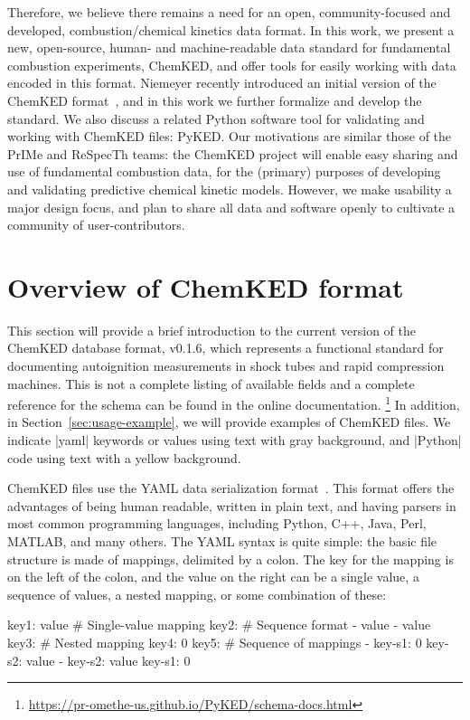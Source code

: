 \documentclass[12pt]{ijck}
\newcommand\ck{ChemKED}
\newcommand\pk{PyKED}
\begin{document}
Therefore, we believe there remains a need for an open, community-focused and
developed, combustion\slash chemical kinetics data format. In this work, we
present a new, open-source, human- and machine-readable data standard for
fundamental combustion experiments, \ck{}, and offer tools for easily working
with data encoded in this format. Niemeyer recently introduced an initial
version of the \ck{} format~\autocite{Niemeyer:2016wf}, and in this work we
further formalize and develop the standard. We also discuss a related Python
software tool for validating and working with \ck{} files: \pk{}. Our
motivations are similar those of the PrIMe and ReSpecTh teams: the \ck{} project
will enable easy sharing and use of fundamental combustion data, for the
(primary) purposes of developing and validating predictive chemical kinetic
models. However, we make usability a major design focus, and plan to share all
data and software openly to cultivate a community of user-contributors.

\section{Overview of ChemKED format}\label{sec:overview-of-format}

This section will provide a brief introduction to the current version of the
\ck{} database format, v0.1.6, which represents a functional standard
for documenting autoignition measurements in shock tubes and rapid compression machines.
This is not a complete listing of available fields and a complete reference for the
schema can be found in the online documentation.
\footnote{\url{https://pr-omethe-us.github.io/PyKED/schema-docs.html}}
In addition, in Section~\ref{sec:usage-example}, we will provide examples of \ck{}
files. We indicate \yabox|yaml| keywords or values using text with gray background,
and \pybox|Python| code using text with a yellow background.

\ck{} files use the YAML data serialization format~\autocite{yaml:1.2}. This
format offers the advantages of being human readable, written in plain text, and
having parsers in most common programming languages, including Python, C++, Java,
Perl, MATLAB, and many others. The YAML syntax is quite simple: the basic file
structure is made of mappings, delimited by a colon. The key for the mapping is
on the left of the colon, and the value on the right can be a single value,
a sequence of values, a nested mapping, or some combination of these:
%
\begin{yamlbox}
key1: value  # Single-value mapping
key2:  # Sequence format
  - value
  - value
key3:  # Nested mapping
  key4: 0
key5:  # Sequence of mappings
  - key-s1: 0
    key-s2: value
  - key-s2: value
    key-s1: 0
\end{yamlbox}
\end{document}
